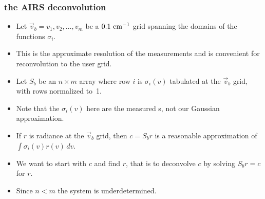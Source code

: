 \documentclass[10pt]{beamer}
\begin{document}
\begin{frame}
\begin{columns}[t]
\begin{column}{0.5\textwidth}
\end{column}
\end{columns}
\end{frame}
\begin{frame}
\frametitle{the AIRS deconvolution}
\begin{itemize}

  \item Let $\vec v_b = v_1,v_2,\ldots,v_m$ be a $0.1~\mbox{cm$^{-1}$}$ grid
    spanning the domains of the functions $\sigma_i$.

  \item This is the approximate resolution of the {\srf}
    measurements and is convenient for reconvolution to the {\cris}
    user grid.

  \item Let $S_b$ be an $n\times m$ array where row $i$ is
    $\sigma_i(v)$ tabulated at the $\vec v_b$ grid, with rows
    normalized to~1.

  \item Note that the $\sigma_i(v)$ here are the measured {\srf}s,
    not our Gaussian approximation.

  \item If $r$ is radiance at the $\vec v_b$ grid, then $c = S_b r$
    is a reasonable approximation of $\int\sigma_i(v)r(v)\,dv$.

  \item We want to start with $c$ and find $r$, that is to
    deconvolve $c$ by solving $S_b r = c$ for $r$.  

  \item Since $n < m$ the system is underdetermined.  

\end{itemize}
\end{frame}
\end{document}
